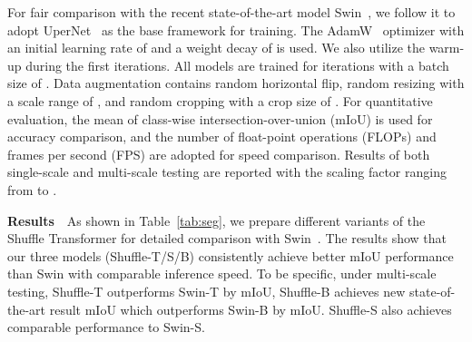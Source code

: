 \documentclass{article}
\begin{document}
For fair comparison with the recent state-of-the-art model Swin~\cite{liu2021Swin}, we follow it to adopt UperNet~\cite{xiao2018unified} as the base framework for training. The AdamW~\cite{loshchilov2017decoupled} optimizer with an initial learning rate of  and a weight decay of  is used. We also utilize the warm-up during the first  iterations. All models are trained for  iterations with a batch size of . Data augmentation contains random horizontal flip, random resizing with a scale range of , and random cropping with a crop size of . For quantitative evaluation, the mean of class-wise intersection-over-union (mIoU) is used for accuracy comparison, and the number of float-point operations (FLOPs) and frames per second (FPS) are adopted for speed comparison. Results of both single-scale and multi-scale testing are reported with the scaling factor ranging from  to . 



\textbf{Results}~~As shown in Table~\ref{tab:seg}, we prepare different variants of the Shuffle Transformer for detailed comparison with Swin~\cite{liu2021Swin}. The results show that our three models (Shuffle-T/S/B) consistently achieve better mIoU performance than Swin with comparable inference speed. To be specific, under multi-scale testing, Shuffle-T outperforms Swin-T by  mIoU, Shuffle-B achieves new state-of-the-art result  mIoU which outperforms Swin-B by  mIoU. Shuffle-S also achieves comparable performance to Swin-S.
\end{document}
